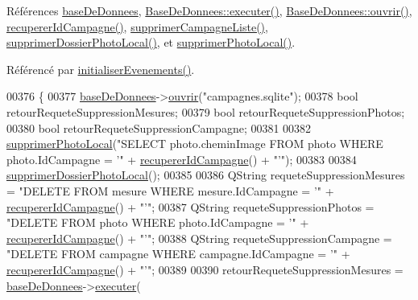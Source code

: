 Références \hyperlink{ihmaccueil_8h_source_l00040}{base\+De\+Donnees}, \hyperlink{basededonnees_8cpp_source_l00104}{Base\+De\+Donnees\+::executer()}, \hyperlink{basededonnees_8cpp_source_l00063}{Base\+De\+Donnees\+::ouvrir()}, \hyperlink{ihmaccueil_8cpp_source_l00205}{recuperer\+Id\+Campagne()}, \hyperlink{ihmaccueil_8cpp_source_l00189}{supprimer\+Campagne\+Liste()}, \hyperlink{ihmaccueil_8cpp_source_l00234}{supprimer\+Dossier\+Photo\+Local()}, et \hyperlink{ihmaccueil_8cpp_source_l00224}{supprimer\+Photo\+Local()}.



Référencé par \hyperlink{ihmaccueil_8cpp_source_l00084}{initialiser\+Evenements()}.


\begin{DoxyCode}
00376 \{
00377     \hyperlink{class_i_h_m_accueil_ab56d9846c071396a92f88272880e2c1f}{baseDeDonnees}->\hyperlink{class_base_de_donnees_a7f6a5510b08017b0d99115a84252f186}{ouvrir}(\textcolor{stringliteral}{"campagnes.sqlite"});
00378     \textcolor{keywordtype}{bool} retourRequeteSuppressionMesures;
00379     \textcolor{keywordtype}{bool} retourRequeteSuppressionPhotos;
00380     \textcolor{keywordtype}{bool} retourRequeteSuppressionCampagne;
00381 
00382     \hyperlink{class_i_h_m_accueil_a9dc22241cd0d4a227b8b0bf04c6404fd}{supprimerPhotoLocal}(\textcolor{stringliteral}{"SELECT photo.cheminImage FROM photo WHERE photo.IdCampagne = '"}
       + \hyperlink{class_i_h_m_accueil_a5e222617897b2c1f7e032fa851aa1700}{recupererIdCampagne}() + \textcolor{stringliteral}{"'"});
00383 
00384     \hyperlink{class_i_h_m_accueil_acb9679f51e140e0bc28d8ac10afd87e9}{supprimerDossierPhotoLocal}();
00385 
00386     QString requeteSuppressionMesures = \textcolor{stringliteral}{"DELETE FROM mesure WHERE mesure.IdCampagne = '"} + 
      \hyperlink{class_i_h_m_accueil_a5e222617897b2c1f7e032fa851aa1700}{recupererIdCampagne}() + \textcolor{stringliteral}{"'"};
00387     QString requeteSuppressionPhotos = \textcolor{stringliteral}{"DELETE FROM photo WHERE photo.IdCampagne = '"} + 
      \hyperlink{class_i_h_m_accueil_a5e222617897b2c1f7e032fa851aa1700}{recupererIdCampagne}() + \textcolor{stringliteral}{"'"};
00388     QString requeteSuppressionCampagne = \textcolor{stringliteral}{"DELETE FROM campagne WHERE campagne.IdCampagne = '"} + 
      \hyperlink{class_i_h_m_accueil_a5e222617897b2c1f7e032fa851aa1700}{recupererIdCampagne}() + \textcolor{stringliteral}{"'"};
00389 
00390     retourRequeteSuppressionMesures = \hyperlink{class_i_h_m_accueil_ab56d9846c071396a92f88272880e2c1f}{baseDeDonnees}->\hyperlink{class_base_de_donnees_aa8de5f8f8bb17edc43f5c0ee33712081}{executer}(

\end{DoxyCode}
